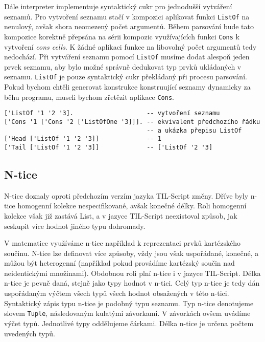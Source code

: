 Dále interpreter implementuje syntaktický cukr pro jednodušší vytváření seznamů. Pro vytvoření
seznamu stačí v kompozici aplikovat funkci \lstinline{ListOf} na nenulový, avšak shora neomezený
počet argumentů. Během parsování bude tato kompozice korektně přepsána na sérii kompozic
využívajících funkci \lstinline{Cons} k vytvoření \textit{cons cells}. K žádné aplikaci funkce
na libovolný počet argumentů tedy nedochází. Při vytváření seznamu pomocí \lstinline{ListOf} musíme
dodat alespoň jeden prvek seznamu, aby bylo možné správně dedukovat typ prvků ukládaných v seznamu.
\lstinline{ListOf} je pouze syntaktický cukr překládaný při procesu parsování. Pokud bychom chtěli
generovat konstrukce konstruující seznamy dynamicky za běhu programu, museli bychom zřetězit
aplikace \lstinline{Cons}.

\begin{lstlisting}[caption={Příklad využití seznamů}]
['ListOf '1 '2 '3].                    -- vytvoření seznamu
['Cons '1 ['Cons '2 ['ListOfOne '3]]]. -- ekvivalent předchozího řádku
                                       -- a ukázka přepisu ListOf
['Head ['ListOf '1 '2 '3]]             -- 1
['Tail ['ListOf '1 '2 '3]]             -- ['ListOf '2 '3]
\end{lstlisting}

\subsection{N-tice}

N-tice doznaly oproti předchozím verzím jazyka TIL-Script změny. Dříve byly n-tice homogenní kolekce
nespecifikované, avšak konečné délky. Roli homogenní kolekce však již zastává List, a v jazyce
TIL-Script neexistoval způsob, jak seskupit více hodnot jiného typu dohromady.

V matematice využíváme n-tice například k reprezentaci prvků kartézského součinu. N-tice lze
definovat více způsoby, vždy jsou však uspořádané, konečné, a můžou být heterogenní (například
pokud provádíme kartézský součin nad neidentickými množinami). Obdobnou roli plní n-tice i v jazyce
TIL-Script. Délka n-tice je pevně daná, stejně jako typy hodnot v n-tici. Celý typ n-tice je
tedy dán uspořádaným výčtem všech typů všech hodnot obsažených v této n-tici. Syntaktický zápis
typu n-tice je podobný typu seznamu. Typ n-tice denotujeme slovem \lstinline{Tuple}, následovaným
kulatými závorkami. V závorkách ovšem uvádíme výčet typů. Jednotlivé typy oddělujeme čárkami. Délka
n-tice je určena počtem uvedených typů.

